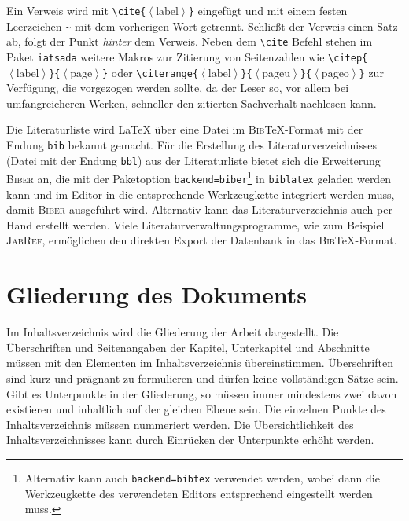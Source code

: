 Ein Verweis wird mit \texttt{\textbackslash{}cite\{$\left\langle\text{label}\right\rangle$\}} eingefügt und mit einem festen Leerzeichen \verb|~| mit dem vorherigen Wort getrennt.
Schließt der Verweis einen Satz ab, folgt der Punkt \emph{hinter} dem Verweis.
Neben dem \texttt{\textbackslash{}cite} Befehl stehen im Paket \texttt{iatsada} weitere Makros zur Zitierung von Seitenzahlen wie \texttt{\textbackslash{}citep\{$\left\langle\text{label}\right\rangle$\}\{$\left\langle\text{page}\right\rangle$\}} oder \texttt{\textbackslash{}citerange\{$\left\langle\text{label}\right\rangle$\}\{$\left\langle\text{pageu}\right\rangle$\}\{$\left\langle\text{pageo}\right\rangle$\}} zur Verfügung, die vorgezogen werden sollte, da der Leser so, vor allem bei umfangreicheren Werken, schneller den zitierten Sachverhalt nachlesen kann.

Die Literaturliste wird \LaTeX{} über eine Datei im \textsc{Bib}\TeX{}-Format mit der Endung \texttt{bib} bekannt gemacht.
Für die Erstellung des Literaturverzeichnisses (Datei mit der Endung \texttt{bbl}) aus der Literaturliste bietet sich die Erweiterung \textsc{Biber} an, die mit der Paketoption \texttt{backend=biber}\footnote{\label{ftn:Fussnote1}Alternativ kann auch \texttt{backend=bibtex} verwendet werden, wobei dann die Werkzeugkette des verwendeten Editors entsprechend eingestellt werden muss.} in \texttt{biblatex} geladen werden kann und im Editor in die entsprechende Werkzeugkette integriert werden muss, damit \textsc{Biber} ausgeführt wird.
Alternativ kann das Literaturverzeichnis auch per Hand erstellt werden.
Viele Literaturverwaltungsprogramme, wie zum Beispiel \textsc{JabRef}, ermöglichen den direkten Export der Datenbank in das \textsc{Bib}\TeX{}-Format.


\section{Gliederung des Dokuments}
\label{sec:Latex-Gliederung}
Im Inhaltsverzeichnis wird die Gliederung der Arbeit dargestellt. Die Überschriften und Seitenangaben der Kapitel, Unterkapitel und Abschnitte müssen mit den Elementen im Inhaltsverzeichnis übereinstimmen. Überschriften sind kurz und prägnant zu formulieren und dürfen keine vollständigen Sätze sein. Gibt es Unterpunkte in der Gliederung, so müssen immer mindestens zwei davon existieren und inhaltlich auf der gleichen Ebene sein. Die einzelnen Punkte des Inhaltsverzeichnis müssen nummeriert werden. Die Übersichtlichkeit des Inhaltsverzeichnisses kann durch Einrücken der Unterpunkte erhöht werden.

